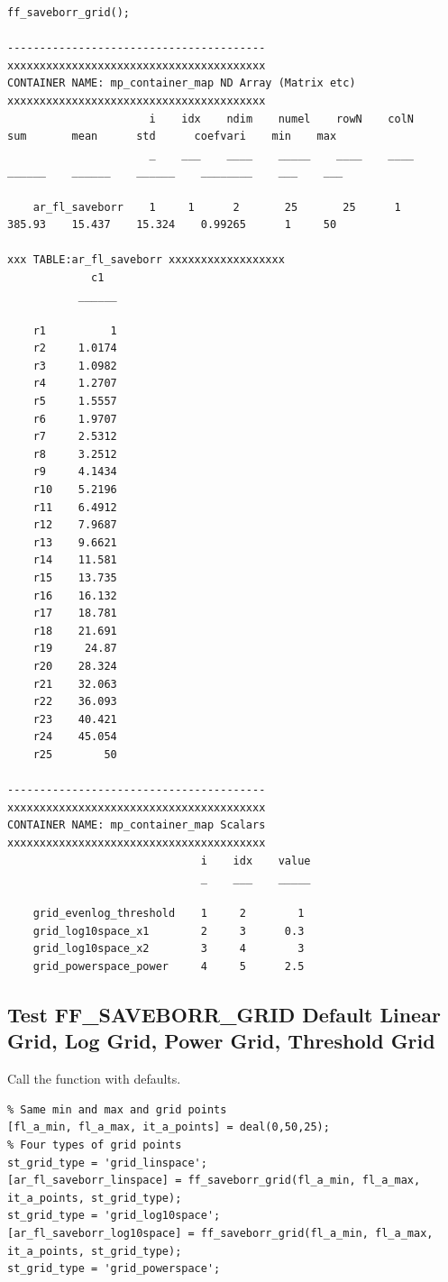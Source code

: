 \documentclass[
]{book}
\begin{document}
\begin{verbatim}
ff_saveborr_grid();

----------------------------------------
xxxxxxxxxxxxxxxxxxxxxxxxxxxxxxxxxxxxxxxx
CONTAINER NAME: mp_container_map ND Array (Matrix etc)
xxxxxxxxxxxxxxxxxxxxxxxxxxxxxxxxxxxxxxxx
                      i    idx    ndim    numel    rowN    colN     sum       mean      std      coefvari    min    max
                      _    ___    ____    _____    ____    ____    ______    ______    ______    ________    ___    ___

    ar_fl_saveborr    1     1      2       25       25      1      385.93    15.437    15.324    0.99265      1     50 

xxx TABLE:ar_fl_saveborr xxxxxxxxxxxxxxxxxx
             c1  
           ______

    r1          1
    r2     1.0174
    r3     1.0982
    r4     1.2707
    r5     1.5557
    r6     1.9707
    r7     2.5312
    r8     3.2512
    r9     4.1434
    r10    5.2196
    r11    6.4912
    r12    7.9687
    r13    9.6621
    r14    11.581
    r15    13.735
    r16    16.132
    r17    18.781
    r18    21.691
    r19     24.87
    r20    28.324
    r21    32.063
    r22    36.093
    r23    40.421
    r24    45.054
    r25        50

----------------------------------------
xxxxxxxxxxxxxxxxxxxxxxxxxxxxxxxxxxxxxxxx
CONTAINER NAME: mp_container_map Scalars
xxxxxxxxxxxxxxxxxxxxxxxxxxxxxxxxxxxxxxxx
                              i    idx    value
                              _    ___    _____

    grid_evenlog_threshold    1     2        1 
    grid_log10space_x1        2     3      0.3 
    grid_log10space_x2        3     4        3 
    grid_powerspace_power     4     5      2.5 
\end{verbatim}

\hypertarget{test-ff_saveborr_grid-default-linear-grid-log-grid-power-grid-threshold-grid}{%
\subsection{Test FF\_SAVEBORR\_GRID Default Linear Grid, Log Grid, Power Grid, Threshold Grid}\label{test-ff_saveborr_grid-default-linear-grid-log-grid-power-grid-threshold-grid}}

Call the function with defaults.

\begin{verbatim}
% Same min and max and grid points
[fl_a_min, fl_a_max, it_a_points] = deal(0,50,25);
% Four types of grid points
st_grid_type = 'grid_linspace';
[ar_fl_saveborr_linspace] = ff_saveborr_grid(fl_a_min, fl_a_max, it_a_points, st_grid_type);
st_grid_type = 'grid_log10space';
[ar_fl_saveborr_log10space] = ff_saveborr_grid(fl_a_min, fl_a_max, it_a_points, st_grid_type);
st_grid_type = 'grid_powerspace';
\end{verbatim}
\end{document}
